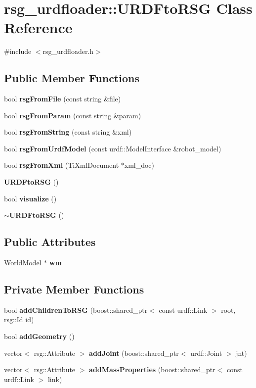 \section{rsg\-\_\-urdfloader\-:\-:\-U\-R\-D\-Fto\-R\-S\-G \-Class \-Reference}
\label{classrsg__urdfloader_1_1URDFtoRSG}


{\ttfamily \#include $<$rsg\-\_\-urdfloader.\-h$>$}

\subsection*{\-Public \-Member \-Functions}
\begin{DoxyCompactItemize}
\item 
bool {\bf rsg\-From\-File} (const string \&file)
\item 
bool {\bf rsg\-From\-Param} (const string \&param)
\item 
bool {\bf rsg\-From\-String} (const string \&xml)
\item 
bool {\bf rsg\-From\-Urdf\-Model} (const urdf\-::\-Model\-Interface \&robot\-\_\-model)
\item 
bool {\bf rsg\-From\-Xml} (\-Ti\-Xml\-Document $\ast$xml\-\_\-doc)
\item 
{\bf \-U\-R\-D\-Fto\-R\-S\-G} ()
\item 
bool {\bf visualize} ()
\item 
{\bf $\sim$\-U\-R\-D\-Fto\-R\-S\-G} ()
\end{DoxyCompactItemize}
\subsection*{\-Public \-Attributes}
\begin{DoxyCompactItemize}
\item 
\-World\-Model $\ast$ {\bf wm}
\end{DoxyCompactItemize}
\subsection*{\-Private \-Member \-Functions}
\begin{DoxyCompactItemize}
\item 
bool {\bf add\-Children\-To\-R\-S\-G} (boost\-::shared\-\_\-ptr$<$ const urdf\-::\-Link $>$ root, rsg\-::\-Id id)
\item 
bool {\bf add\-Geometry} ()
\item 
vector$<$ rsg\-::\-Attribute $>$ {\bf add\-Joint} (boost\-::shared\-\_\-ptr$<$ urdf\-::\-Joint $>$ jnt)
\item 
vector$<$ rsg\-::\-Attribute $>$ {\bf add\-Mass\-Properties} (boost\-::shared\-\_\-ptr$<$ const urdf\-::\-Link $>$ link)
\end{DoxyCompactItemize}


